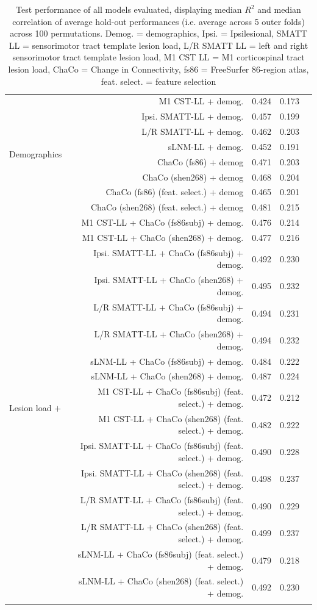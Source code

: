 \documentclass[10pt]{article}
\def\Plus{\texttt{+}}
\begin{document}
\begin{table}[h]
\begin{tabular}{lrrll}
\multirow[t]{8}{*}{Demographics} & M1 CST-LL + demog. & 0.424 & 0.173 \\
 & Ipsi. SMATT-LL + demog. & 0.457 & 0.199 \\
 & L/R SMATT-LL + demog. & 0.462 & 0.203 \\
 & sLNM-LL + demog. & 0.452 & 0.191 \\
 & ChaCo (fs86) + demog & 0.471 & 0.203 \\
 & ChaCo (shen268) + demog & 0.468 & 0.204 \\
 & ChaCo (fs86) (feat. select.) + demog & 0.465 & 0.201 \\
 & ChaCo (shen268) (feat. select.) + demog & 0.481 & 0.215 \\
\multirow[t]{16}{*}{Lesion load $\Plus$} & M1 CST-LL + ChaCo (fs86subj) + demog. & 0.476 & 0.214 \\
 ChaCo $\Plus$ & M1 CST-LL + ChaCo (shen268) + demog. & 0.477 & 0.216 \\
 Demographics & Ipsi. SMATT-LL + ChaCo (fs86subj) + demog. & 0.492 & 0.230 \\
 & Ipsi. SMATT-LL + ChaCo (shen268) + demog. & 0.495 & 0.232 \\
 & L/R SMATT-LL + ChaCo (fs86subj) + demog. & 0.494 & 0.231 \\
 & L/R SMATT-LL + ChaCo (shen268) + demog. & 0.494 & 0.232 \\
 & sLNM-LL + ChaCo (fs86subj) + demog. & 0.484 & 0.222 \\
 & sLNM-LL + ChaCo (shen268) + demog. & 0.487 & 0.224 \\
 & M1 CST-LL + ChaCo (fs86subj) (feat. select.) + demog. & 0.472 & 0.212 \\
 & M1 CST-LL + ChaCo (shen268) (feat. select.) + demog. & 0.482 & 0.222 \\
 & Ipsi. SMATT-LL + ChaCo (fs86subj) (feat. select.) + demog. & 0.490 & 0.228 \\
 & Ipsi. SMATT-LL + ChaCo (shen268) (feat. select.) + demog. & 0.498 & 0.237 \\
 & L/R SMATT-LL + ChaCo (fs86subj) (feat. select.) + demog. & 0.490 & 0.229 \\
 & L/R SMATT-LL + ChaCo (shen268) (feat. select.) + demog. & 0.499 & 0.237 \\
 & sLNM-LL + ChaCo (fs86subj) (feat. select.) + demog. & 0.479 & 0.218 \\
 & sLNM-LL + ChaCo (shen268) (feat. select.) + demog. & 0.492 & 0.230 \\
 
 \arrayrulecolor{black}\bottomrule
\end{tabular}
\caption{Test performance of all models evaluated, displaying median $R^2$ and median correlation of average hold-out performances (i.e. average across 5 outer folds) across 100 permutations. Demog. = demographics, Ipsi. = Ipsilesional, SMATT LL = sensorimotor tract template lesion load, L/R SMATT LL = left and right sensorimotor tract template lesion load, M1 CST LL = M1 corticospinal tract lesion load, ChaCo = Change in Connectivity, fs86 = FreeSurfer 86-region atlas, feat. select. = feature selection}
\label{results_table_acutechronic}

\end{table}
\end{document}
